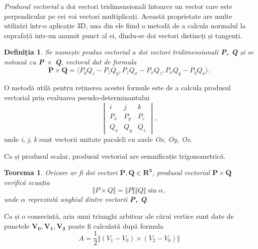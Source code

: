 \textit{Produsul vectorial} a doi vectori tridimensionali întoarce un vector
care este perpendicular pe cei voi vectori multiplicați. Această proprietate are
multe utilizări într-o aplicație 3D, una din ele fiind o metodă de a calcula
normalul la suprafață intr-un anumit punct al ei, dîndu-se doi vectori distincți
și tangenți.

\newtheorem{crossproduct_def}[def_dotproduct]{Definiția}
\begin{crossproduct_def}
Se numește produs vectorial a doi vectori tridimensionali \textbf{P, Q} și se
notează cu \textbf{P $\times$ Q}, vectorul dat de formula
\begin{equation}
\label{eq:vec:12}
\mathbf{P \times Q} = \langle P_yQ_z - P_zQ_y, P_zQ_x - P_xQ_z, P_xQ_y - P_yQ_x
\rangle.
\end{equation}
\end{crossproduct_def}
O metodă utilă pentru reținerea acestei formule este de a calcula produsul
vectorial prin evaluarea pseudo-determinantului
\begin{equation}
\begin{vmatrix}
i & j & k \\
P_x & P_y & P_z \\
Q_x & Q_y & Q_z
\end{vmatrix},
\end{equation} unde \textit{i}, \textit{j}, \textit{k} sunt vectorii unitate
paraleli cu axele \textit{Ox, Oy, Oz}.

\indent
Ca și produsul scalar, produsul vectorial are semnificație trigonometrică.

\newtheorem{crossproduct_trig}[vector_arith]{Teorema}
\begin{crossproduct_trig}
Oricare ar fi doi vectori $\mathbf{P, Q \in R^3}$, produsul vectorial
$\mathbf{P \times Q}$ verifică ecuația
\begin{equation}
\label{eq:vec:13}
\Vert P \times Q \Vert = \Vert P \Vert \Vert Q \Vert \sin \alpha,
\end{equation} unde $\alpha$ reprezintă unghiul dintre vectorii \textbf{P, Q}.
\end{crossproduct_trig}

Ca și o consecință, aria unui triunghi arbitrar ale cărui vertice sunt
date de punctele $\mathbf{V_0, V_1, V_2}$ poate fi calculată după formula
\begin{equation}
\label{eq:vec:cross_tri_area}
A = \frac{1}{2} \Vert (V_1 - V_0) \times (V_2 - V_0) \Vert
\end{equation}

